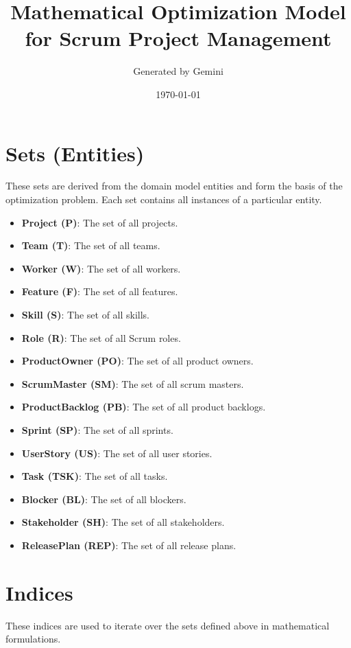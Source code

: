 \documentclass[11pt]{article}
\title{Mathematical Optimization Model for Scrum Project Management}
\author{Generated by Gemini}
\date{\today}
\begin{document}
\maketitle
\tableofcontents
\newpage

\section{Sets (Entities)}
These sets are derived from the domain model entities and form the basis of the optimization problem. Each set contains all instances of a particular entity.

\begin{itemize}
    \item \textbf{Project (P)}: The set of all projects.
    \item \textbf{Team (T)}: The set of all teams.
    \item \textbf{Worker (W)}: The set of all workers.
    \item \textbf{Feature (F)}: The set of all features.
    \item \textbf{Skill (S)}: The set of all skills.
    \item \textbf{Role (R)}: The set of all Scrum roles.
    \item \textbf{ProductOwner (PO)}: The set of all product owners.
    \item \textbf{ScrumMaster (SM)}: The set of all scrum masters.
    \item \textbf{ProductBacklog (PB)}: The set of all product backlogs.
    \item \textbf{Sprint (SP)}: The set of all sprints.
    \item \textbf{UserStory (US)}: The set of all user stories.
    \item \textbf{Task (TSK)}: The set of all tasks.
    \item \textbf{Blocker (BL)}: The set of all blockers.
    \item \textbf{Stakeholder (SH)}: The set of all stakeholders.
    \item \textbf{ReleasePlan (REP)}: The set of all release plans.
\end{itemize}

\section{Indices}
These indices are used to iterate over the sets defined above in mathematical formulations.
\end{document}
